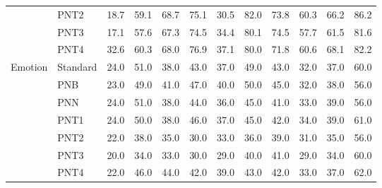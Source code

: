 \begin{table}[t]
{\begin{tabular}{llrrrrrrrrrr}
 & PNT2 & {\footnotesize 18.7} & {\footnotesize 59.1} & {\footnotesize 68.7} & {\footnotesize 75.1} & {\footnotesize 30.5} & {\footnotesize 82.0} & {\footnotesize 73.8} & {\footnotesize 60.3} & {\footnotesize 66.2} & {\footnotesize 86.2} \\
 & PNT3 & {\footnotesize 17.1} & {\footnotesize 57.6} & {\footnotesize 67.3} & {\footnotesize 74.5} & {\footnotesize 34.4} & {\footnotesize 80.1} & {\footnotesize 74.5} & {\footnotesize 57.7} & {\footnotesize 61.5} & {\footnotesize 81.6} \\
 & PNT4 & {\footnotesize 32.6} & {\footnotesize 60.3} & {\footnotesize 68.0} & {\footnotesize 76.9} & {\footnotesize 37.1} & {\footnotesize 80.0} & {\footnotesize 71.8} & {\footnotesize 60.6} & {\footnotesize 68.1} & {\footnotesize 82.2} \\
\midrule
Emotion & Standard & {\footnotesize 24.0} & {\footnotesize 51.0} & {\footnotesize 38.0} & {\footnotesize 43.0} & {\footnotesize 37.0} & {\footnotesize 49.0} & {\footnotesize 43.0} & {\footnotesize 32.0} & {\footnotesize 37.0} & {\footnotesize 60.0} \\
 & PNB & {\footnotesize 23.0} & {\footnotesize 49.0} & {\footnotesize 41.0} & {\footnotesize 47.0} & {\footnotesize 40.0} & {\footnotesize 50.0} & {\footnotesize 45.0} & {\footnotesize 32.0} & {\footnotesize 38.0} & {\footnotesize 56.0} \\
 & PNN & {\footnotesize 24.0} & {\footnotesize 51.0} & {\footnotesize 38.0} & {\footnotesize 44.0} & {\footnotesize 36.0} & {\footnotesize 45.0} & {\footnotesize 41.0} & {\footnotesize 33.0} & {\footnotesize 39.0} & {\footnotesize 56.0} \\
 & PNT1 & {\footnotesize 24.0} & {\footnotesize 50.0} & {\footnotesize 38.0} & {\footnotesize 46.0} & {\footnotesize 37.0} & {\footnotesize 45.0} & {\footnotesize 42.0} & {\footnotesize 34.0} & {\footnotesize 39.0} & {\footnotesize 61.0} \\
 & PNT2 & {\footnotesize 22.0} & {\footnotesize 38.0} & {\footnotesize 35.0} & {\footnotesize 30.0} & {\footnotesize 33.0} & {\footnotesize 36.0} & {\footnotesize 39.0} & {\footnotesize 31.0} & {\footnotesize 35.0} & {\footnotesize 56.0} \\
 & PNT3 & {\footnotesize 20.0} & {\footnotesize 34.0} & {\footnotesize 33.0} & {\footnotesize 30.0} & {\footnotesize 29.0} & {\footnotesize 40.0} & {\footnotesize 41.0} & {\footnotesize 29.0} & {\footnotesize 34.0} & {\footnotesize 60.0} \\
 & PNT4 & {\footnotesize 22.0} & {\footnotesize 46.0} & {\footnotesize 44.0} & {\footnotesize 42.0} & {\footnotesize 39.0} & {\footnotesize 43.0} & {\footnotesize 42.0} & {\footnotesize 33.0} & {\footnotesize 37.0} & {\footnotesize 62.0} \\

\end{tabular}}
\end{table}
